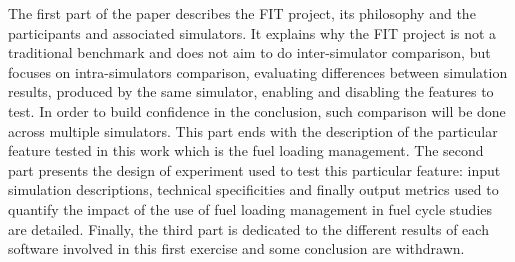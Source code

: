 The first part of the paper describes the FIT project, its philosophy and the
participants and associated simulators. It explains why the FIT project is not a
traditional benchmark and does not aim to do inter-simulator comparison, but
focuses on intra-simulators comparison, evaluating differences between
simulation results, produced by the same simulator, enabling and disabling  the
features to test. In order to build confidence in the conclusion, such
comparison will be done across multiple simulators. This part ends with the
description of the particular feature tested in this work which is the fuel
loading management. The second part presents the design of experiment used to
test this particular feature: input simulation descriptions, technical
specificities and finally output metrics used to quantify the impact of the use
of fuel loading management in fuel cycle studies are detailed. Finally, the
third part is dedicated to the different results of each software involved in
this first exercise and some conclusion are withdrawn.
